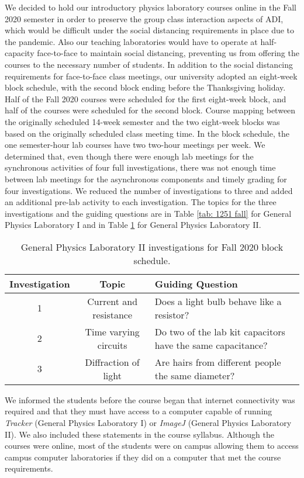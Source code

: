 \documentclass[aip, numerical, preprint]{revtex4-2}
\begin{document}
We decided to hold our introductory physics laboratory courses online in the Fall 2020 semester
in order to preserve the group class interaction aspects of ADI, which would be difficult under
the social distancing requirements in place due to the pandemic.\citep{mclber20} Also our
teaching laboratories would have to operate at half-capacity face-to-face to maintain social
distancing, preventing us from offering the courses to the necessary number of students.  In
addition to the social distancing requirements for face-to-face class meetings, our university
adopted an eight-week block schedule, with the second block ending before the Thanksgiving
holiday. Half of the Fall 2020 courses were scheduled for the first eight-week block, and half
of the courses were scheduled for the second block. Course mapping between the originally
scheduled 14-week semester and the two eight-week blocks was based on the originally scheduled
class meeting time. In the block schedule, the one semester-hour lab courses have two two-hour
meetings per week. We determined that, even though there were enough lab meetings for the
synchronous activities of four full investigations, there was not enough time between lab
meetings for the asynchronous components and timely grading for four investigations. We reduced
the number of investigations to three and added an additional pre-lab activity to each
investigation. The topics for the three investigations and the guiding questions are in Table
\ref{tab: 1251 fall} for General Physics Laboratory I and in Table \ref{tab: 1261 fall} for
General Physics Laboratory II.

\begin{table}
  \caption{\label{tab: 1261 fall} General Physics Laboratory II investigations for Fall 2020
    block schedule.}
  \begin{tabular}{ccp{26em}}
    \hline\hline
    Investigation & Topic & Guiding Question\\
    \hline
    1 & Current and resistance & Does a light bulb behave like a resistor? \\
    2 & Time varying circuits & Do two of the lab kit capacitors have the same capacitance? \\
    3 & Diffraction of light & Are hairs from different people the same diameter? \\
    \hline\hline
  \end{tabular}
\end{table}

We informed the students before the course began that internet connectivity was required and
that they must have access to a computer capable of running \emph{Tracker} (General Physics
Laboratory I) or \emph{ImageJ} (General Physics Laboratory II). We also included these
statements in the course syllabus. Although the courses were online, most of the students were
on campus allowing them to access campus computer laboratories if they did on a computer that
met the course requirements.
  
\end{document}
